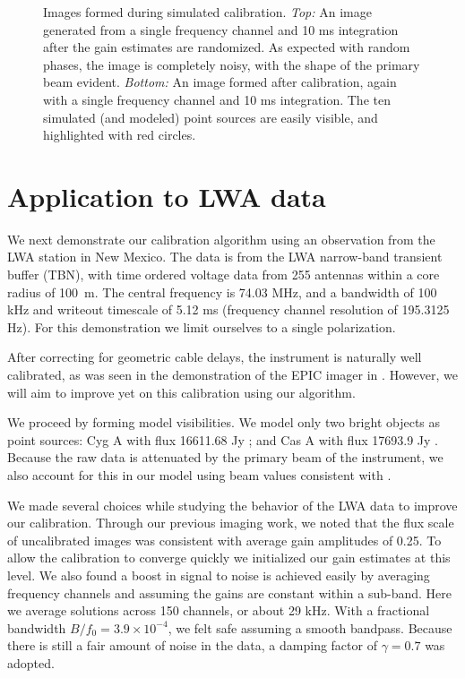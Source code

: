 \documentclass[a4paper,fleqn,usenatbib]{../mnras}
\begin{document}
\begin{figure}
\begin{center}
\caption{Images formed during simulated calibration. \emph{Top:} An image generated from a single frequency channel and 10 ms integration after the gain estimates are randomized. As expected with random phases, the image is completely noisy, with the shape of the primary beam evident. \emph{Bottom:} An image formed after calibration, again with a single frequency channel and 10 ms integration. The ten simulated (and modeled) point sources are easily visible, and highlighted with red circles.
}
\label{fig:sim_images}
\end{center}
\end{figure}

\section{Application to LWA data}\label{sec:data}
We next demonstrate our calibration algorithm using an observation from the LWA station in New Mexico. The data is from the LWA narrow-band transient buffer (TBN), with time ordered voltage data from 255 antennas within a core radius of 100~m. The central frequency is 74.03 MHz, and a bandwidth of 100 kHz and writeout timescale of 5.12 ms (frequency channel resolution of 195.3125 Hz). For this demonstration we limit ourselves to a single polarization.

After correcting for geometric cable delays, the instrument is naturally well calibrated, as was seen in the demonstration of the EPIC imager in \citealt{thy15c}. However, we will aim to improve yet on this calibration using our algorithm.

We proceed by forming model visibilities. We model only two bright objects as point sources: Cyg A with flux 16611.68 Jy \citep{coh07}; and Cas A with flux 17693.9 Jy \citep{kas07}. Because the raw data is attenuated by the primary beam of the instrument, we also account for this in our model using beam values consistent with \cite{hic12}.

We made several choices while studying the behavior of the LWA data to improve our calibration. Through our previous imaging work, we noted that the flux scale of uncalibrated images was consistent with average gain amplitudes of 0.25. To allow the calibration to converge quickly we initialized our gain estimates at this level. We also found a boost in signal to noise is achieved easily by averaging frequency channels and assuming the gains are constant within a sub-band. Here we average solutions across 150 channels, or about 29 kHz. With a fractional bandwidth $B/f_0 = 3.9 \times 10^{-4}$, we felt safe assuming a smooth bandpass. Because there is still a fair amount of noise in the data, a damping factor of $\gamma = 0.7$ was adopted.
\end{document}
